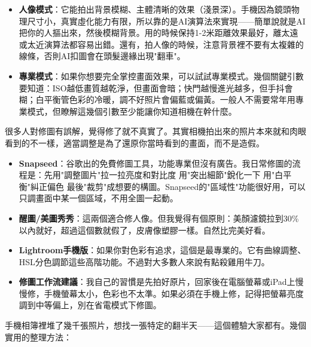 
\begin{itemize}
  \item \textbf{人像模式}：它能拍出背景模糊、主體清晰的效果（淺景深）。手機因為鏡頭物理尺寸小，真實虛化能力有限，所以靠的是AI演算法來實現——簡單說就是AI把你的人摳出來，然後模糊背景。用的時候保持1-2米距離效果最好，離太遠或太近演算法都容易出錯。還有，拍人像的時候，注意背景裡不要有太複雜的線條，否則AI扣圖會在頭髮邊緣出現"翻車"。
  \item \textbf{專業模式}：如果你想要完全掌控畫面效果，可以試試專業模式。幾個關鍵引數要知道：ISO越低畫質越乾淨，但畫面會暗；快門越慢進光越多，但手抖會糊；白平衡管色彩的冷暖，調不好照片會偏藍或偏黃。一般人不需要常年用專業模式，但瞭解這幾個引數至少能讓你知道相機在幹什麼。
\end{itemize}


很多人對修圖有誤解，覺得修了就不真實了。其實相機拍出來的照片本來就和肉眼看到的不一樣，適當調整是為了還原你當時看到的畫面，而不是造假。

\begin{itemize}
  \item \textbf{Snapseed}：谷歌出的免費修圖工具，功能專業但沒有廣告。我日常修圖的流程是：先用"調整圖片"拉一拉亮度和對比度 用"突出細節"銳化一下 用"白平衡"糾正偏色 最後"裁剪"成想要的構圖。Snapseed的"區域性"功能很好用，可以只調畫面中某一個區域，不用全圖一起動。
  \item \textbf{醒圖/美圖秀秀}：這兩個適合修人像。但我覺得有個原則：美顏濾鏡拉到30\%以內就好，超過這個數就假了，皮膚像塑膠一樣。自然比完美好看。
  \item \textbf{Lightroom手機版}：如果你對色彩有追求，這個是最專業的。它有曲線調整、HSL分色調節這些高階功能。不過對大多數人來說有點殺雞用牛刀。
  \item \textbf{修圖工作流建議}：我自己的習慣是先拍好原片，回家後在電腦螢幕或iPad上慢慢修，手機螢幕太小，色彩也不太準。如果必須在手機上修，記得把螢幕亮度調到中等偏上，別在省電模式下修圖。
\end{itemize}


手機相簿裡堆了幾千張照片，想找一張特定的翻半天——這個體驗大家都有。幾個實用的整理方法：

